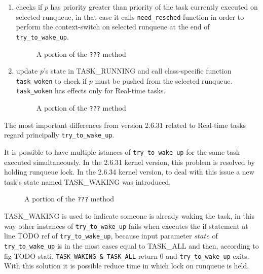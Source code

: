 \begin{enumerate}
\item checks if $p$ has priority greater than priority of the task currently
executed on selected runqueue, in that case it calls \texttt{need\_resched}
function in order to perform the context-switch on selected runqueue at the
end of \texttt{try\_to\_wake\_up}.

\begin{figure}[h]
  \lstset{basicstyle=\footnotesize, language=c, captionpos=b, frame=single,label=lis:steps}
  
  \label{code:ttwu}
  \caption{A portion of the \texttt{???} method}
\end{figure}

\item update $p$'s state in TASK\_RUNNING and call class-specific function 
\texttt{task\_woken} to check if $p$ must be pushed from the selected runqueue.
\texttt{task\_woken} has effects only for Real-time tasks.

\begin{figure}[h]
  \lstset{basicstyle=\footnotesize, language=c, captionpos=b, frame=single,label=lis:steps}
  
  \label{code:ttwu}
  \caption{A portion of the \texttt{???} method}
\end{figure}

\end{enumerate}

The most important differences from version 2.6.31 related to Real-time tasks regard principally \texttt{try\_to\_wake\_up}.

It is possible to have multiple istances of \texttt{try\_to\_wake\_up} for the same task executed simultaneously. In the 2.6.31 kernel version, this problem
is resolved by holding runqueue lock. In the 2.6.34 kernel version, to deal with this issue a new task's state named TASK\_WAKING was introduced. 

\begin{figure}[h]
  \lstset{basicstyle=\footnotesize, language=c, captionpos=b, frame=single,label=lis:steps}
  
  \label{code:ttwu}
  \caption{A portion of the \texttt{???} method}
\end{figure}

TASK\_WAKING is used to indicate someone is already waking the task, in this way other instances of \texttt{try\_to\_wake\_up} fails when executes the if 
statement at line TODO ref of \texttt{try\_to\_wake\_up}, because input parameter $state$ of \texttt{try\_to\_wake\_up} is in the most cases equal to 
TASK\_ALL and then, according to fig TODO stati, \texttt{TASK\_WAKING \& TASK\_ALL} return 0 and \texttt{try\_to\_wake\_up} exits. With this solution 
it is possible reduce time in which lock on runqueue is held. 


